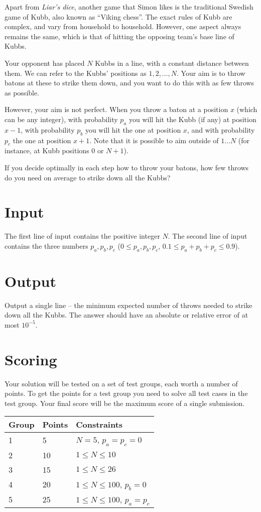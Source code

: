 Apart from \emph{Liar's dice}, another game that Simon likes is the traditional Swedish game of Kubb,
also known as ``Viking chess''.
The exact rules of Kubb are complex, and vary from household to household.
However, one aspect always remains the same, which is that of hitting the opposing team's base line of Kubbs.

Your opponent has placed $N$ Kubbs in a line, with a constant distance between them.
We can refer to the Kubbs' positions as $1, 2, \dots, N$.
Your aim is to throw batons at these to strike them down, and
you want to do this with as few throws as possible.

However, your aim is not perfect. When you throw a baton at a position $x$ (which can be any integer),
with probability $p_a$ you will hit the Kubb (if any) at position $x-1$,
with probability $p_b$ you will hit the one at position $x$, and
with probability $p_c$ the one at position $x+1$.
Note that it is possible to aim outside of $1 \dots N$ (for instance, at Kubb positions $0$ or $N+1$).

If you decide optimally in each step how to throw your batons,
how few throws do you need on average to strike down all the Kubbs?

\section*{Input}
The first line of input contains the positive integer $N$.
The second line of input contains the three numbers $p_a, p_b, p_c$ ($0 \le p_a, p_b, p_c$, $0.1 \le p_a + p_b + p_c \le 0.9$).

\section*{Output}
Output a single line -- the minimum expected number of throws needed to strike down all the Kubbs.
The answer should have an absolute or relative error of at most $10^{-5}$.

\section*{Scoring}
Your solution will be tested on a set of test groups, each worth a number of points.
To get the points for a test group you need to solve all test cases in the test group.
Your final score will be the maximum score of a single submission.

\noindent
\begin{tabular}{| l | l | l |}
\hline
Group & Points & Constraints \\ \hline
1     & 5      & $N = 5$, $p_a = p_c = 0$ \\ \hline
2     & 10     & $1 \le N \le 10$ \\ \hline
3     & 15     & $1 \le N \le 26$ \\ \hline
4     & 20     & $1 \le N \le 100$, $p_b = 0$ \\ \hline
5     & 25     & $1 \le N \le 100$, $p_a = p_c$ \\ \hline
\end{tabular}
